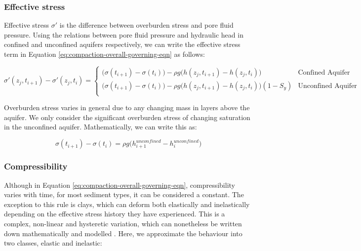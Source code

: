 \documentclass{article}
\begin{document}
\subsubsection{Effective stress}

Effective stress $\sigma'$ is the difference between overburden stress and pore fluid pressure. Using the relations between pore fluid pressure and hydraulic head in confined and unconfined aquifers respectively, we can write the effective stress term in Equation \ref{eq:compaction-overall-governing-eqn} as follows:

\begin{equation}
\label{eqn:effective-stress} 
\sigma'(z_j,t_{i+1}) - \sigma'(z_j,t_i) =
\begin{cases}
\bigg( \sigma (t_{i+1}) - \sigma(t_i) \bigg) - \rho g \big( h(z_j,t_{i+1}) - h(z_j,t_i) \big) & \text{Confined Aquifer} \\
\bigg( \sigma (t_{i+1}) - \sigma(t_i) \bigg) - \rho g \big( h(z_j,t_{i+1}) - h(z_j,t_i) \big)(1-S_y) & \text{Unconfined Aquifer} \\
\end{cases}
\end{equation}

Overburden stress varies in general due to any changing mass in layers above the aquifer. We only consider the significant overburden stress of changing saturation in the unconfined aquifer. Mathematically, we can write this as:

\begin{equation}
\label{eq:overburden}
\sigma (t_{i+1}) - \sigma(t_i) = \rho g \big( h^{unconfined}_{i+1} - h^{unconfined}_i \big)
\end{equation}


\subsubsection{Compressibility}

Although in Equation \ref{eq:compaction-overall-governing-eqn}, compressibility varies with time, for most sediment types, it can be considered a constant. The exception to this rule is clays, which can deform both elastically and inelastically depending on the effective stress history they have experienced. This is a complex, non-linear and hysteretic variation, which can nonetheless be written down mathematically and modelled \cite{helm_one-dimensional_1976}. Here, we approximate the behaviour into two classes, elastic and inelastic:
\end{document}
